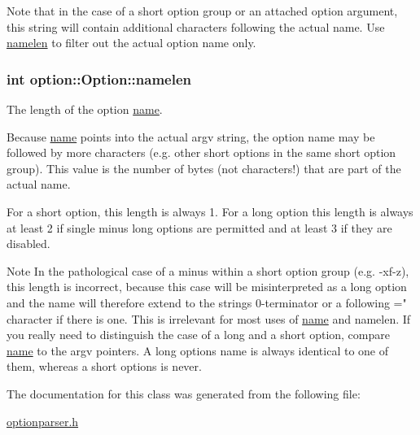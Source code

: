 Note that in the case of a short option group or an attached option argument, this string will contain additional characters following the actual name. Use \hyperlink{classoption_1_1Option_a3aa2957b19ad5815873441b415d56050}{namelen} to filter out the actual option name only. 
\subsubsection[{\texorpdfstring{namelen}{namelen}}]{\setlength{\rightskip}{0pt plus 5cm}int option\+::\+Option\+::namelen}\hypertarget{classoption_1_1Option_a3aa2957b19ad5815873441b415d56050}{}\label{classoption_1_1Option_a3aa2957b19ad5815873441b415d56050}


The length of the option \hyperlink{classoption_1_1Option_a02a76b4896abd22d0ba8514362261de9}{name}. 

Because \hyperlink{classoption_1_1Option_a02a76b4896abd22d0ba8514362261de9}{name} points into the actual {\ttfamily argv} string, the option name may be followed by more characters (e.\+g. other short options in the same short option group). This value is the number of bytes (not characters!) that are part of the actual name.

For a short option, this length is always 1. For a long option this length is always at least 2 if single minus long options are permitted and at least 3 if they are disabled.

\begin{DoxyNote}{Note}
In the pathological case of a minus within a short option group (e.\+g. {\ttfamily -\/xf-\/z}), this length is incorrect, because this case will be misinterpreted as a long option and the name will therefore extend to the string\textquotesingle{}s 0-\/terminator or a following \textquotesingle{}=" character if there is one. This is irrelevant for most uses of \hyperlink{classoption_1_1Option_a02a76b4896abd22d0ba8514362261de9}{name} and {\ttfamily namelen}. If you really need to distinguish the case of a long and a short option, compare \hyperlink{classoption_1_1Option_a02a76b4896abd22d0ba8514362261de9}{name} to the {\ttfamily argv} pointers. A long option\textquotesingle{}s {\ttfamily name} is always identical to one of them, whereas a short option\textquotesingle{}s is never. 
\end{DoxyNote}


The documentation for this class was generated from the following file\+:\begin{DoxyCompactItemize}
\item 
\hyperlink{optionparser_8h}{optionparser.\+h}\end{DoxyCompactItemize}
